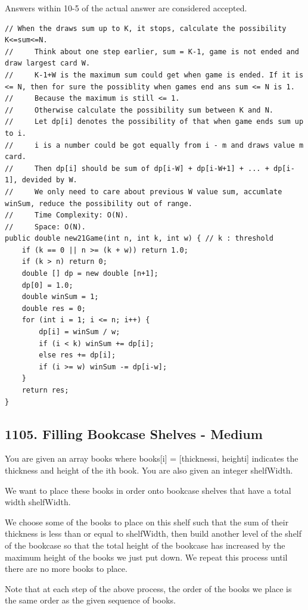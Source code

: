 \documentclass[9pt, b5paaper]{book}
\begin{document}
Answers within 10-5 of the actual answer are considered accepted.
\begin{verbatim}
// When the draws sum up to K, it stops, calculate the possibility K<=sum<=N.
//     Think about one step earlier, sum = K-1, game is not ended and draw largest card W.
//     K-1+W is the maximum sum could get when game is ended. If it is <= N, then for sure the possiblity when games end ans sum <= N is 1.
//     Because the maximum is still <= 1.
//     Otherwise calculate the possibility sum between K and N.
//     Let dp[i] denotes the possibility of that when game ends sum up to i.
//     i is a number could be got equally from i - m and draws value m card.
//     Then dp[i] should be sum of dp[i-W] + dp[i-W+1] + ... + dp[i-1], devided by W.
//     We only need to care about previous W value sum, accumlate winSum, reduce the possibility out of range.
//     Time Complexity: O(N).
//     Space: O(N).
public double new21Game(int n, int k, int w) { // k : threshold
    if (k == 0 || n >= (k + w)) return 1.0;
    if (k > n) return 0;
    double [] dp = new double [n+1];
    dp[0] = 1.0;
    double winSum = 1;
    double res = 0;
    for (int i = 1; i <= n; i++) {
        dp[i] = winSum / w;
        if (i < k) winSum += dp[i];
        else res += dp[i];
        if (i >= w) winSum -= dp[i-w];
    }
    return res;
}
\end{verbatim}
\subsection{1105. Filling Bookcase Shelves - Medium}
\label{sec-1-4-53}
You are given an array books where books[i] = [thicknessi, heighti] indicates the thickness and height of the ith book. You are also given an integer shelfWidth.

We want to place these books in order onto bookcase shelves that have a total width shelfWidth.

We choose some of the books to place on this shelf such that the sum of their thickness is less than or equal to shelfWidth, then build another level of the shelf of the bookcase so that the total height of the bookcase has increased by the maximum height of the books we just put down. We repeat this process until there are no more books to place.

Note that at each step of the above process, the order of the books we place is the same order as the given sequence of books.
\end{document}
